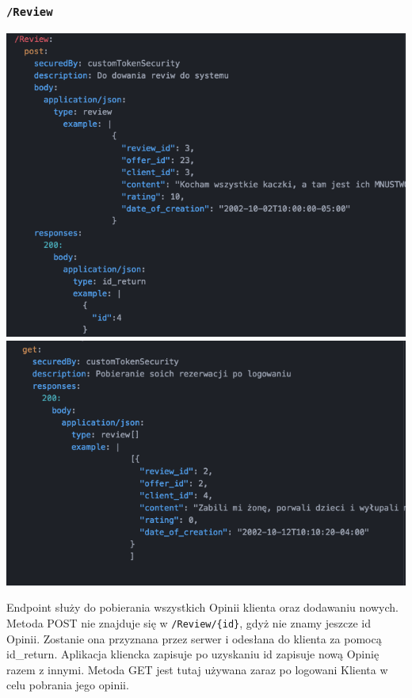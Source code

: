 \documentclass{article}
\begin{document}
\subsubsection{\texttt{/Review}}

\includegraphics[width=\linewidth]{Review+id/post.png}
\newline
\includegraphics[width=\linewidth]{Review+id/get[].png}

Endpoint służy do pobierania wszystkich Opinii klienta oraz dodawaniu nowych.
Metoda POST nie znajduje się w \texttt{/Review/\{id\}}, gdyż nie znamy jeszcze id Opinii. Zostanie ona przyznana przez serwer i odesłana do klienta za pomocą id\_return. Aplikacja kliencka zapisuje po uzyskaniu id zapisuje nową Opinię razem z innymi.
Metoda GET jest tutaj używana zaraz po logowani Klienta w celu pobrania jego opinii.
\end{document}
